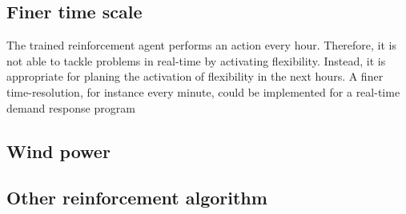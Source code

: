 \documentclass[class=book, crop=false, 11pt]{standalone}
\begin{document}
\subsection*{Finer time scale}
The trained reinforcement agent performs an action every hour. Therefore, it is not able to tackle problems in real-time by activating flexibility. Instead, it is appropriate for planing the activation of flexibility in the next hours. A finer time-resolution, for instance every minute, could be implemented for a real-time demand response program
\subsection*{Wind power}
\subsection*{Other reinforcement algorithm}
\end{document}
